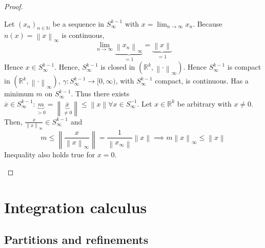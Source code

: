 \documentclass{article}
\newcommand{\norm}[1]{\left\|#1\right\|}
\begin{document}
\begin{proof}
\begin{enumerate}
      Let $(x_n)_{n \in \mathbb N}$ be a sequence in $S_{\infty}^{k-1}$ with $x = \lim_{n\to\infty} x_n$. Because $n(x) = \norm{x}_{\infty}$ is continuous,
      \[ \lim_{n\to\infty} \underbrace{\norm{x_n}_{\infty}}_{=1} = \underbrace{\norm{x}}_{=1} \]
      Hence $x \in S_{\infty}^{k-1}$. Hence, $S_{\infty}^{k-1}$ is closed in $(\mathbb R^k, \norm{\cdot}_{\infty})$.
      Hence $S_{\infty}^{k-1}$ is compact in $(\mathbb R^k, \norm{\cdot}_{\infty})$, $\gamma: S_{\infty}^{k-1} \to [0, \infty)$, with $S_{\infty}^{k-1}$ compact, is continuous.
      Has a minimum $m$ on $S_{\infty}^{k-1}$. Thus there exists $\overline{x} \in S_{\infty}^{k-1}: \underbrace{m}_{> 0} = \norm{\underbrace{\overline{x}}_{\neq 0}} \leq \norm{x} \forall x \in S_{\infty}^{-1}$.
      Let $x \in \mathbb R^k$ be arbitrary with $x \neq 0$. Then, $\frac{x}{\norm{x}_{\infty}} \in S_{\infty}^{k-1}$ and
      \[ m \leq \norm{\frac{x}{\norm{x}_{\infty}}} = \frac{1}{\norm{x_{\infty}}} \norm{x} \implies m \norm{x}_{\infty} \leq \norm{x} \]
      Inequality also holds true for $x = 0$.
  \end{enumerate}
\end{proof}

\section{Integration calculus}
\subsection{Partitions and refinements}
\end{document}
